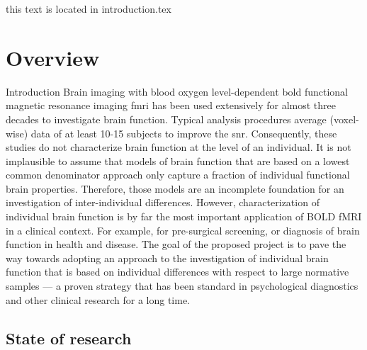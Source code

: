 this text is located in introduction.tex

\section{Overview}

%
Introduction Brain imaging with blood oxygen level-dependent \ac{bold}
functional magnetic resonance imaging \ac{fmri} has been used extensively for
almost three decades to investigate brain function.
%
Typical analysis procedures average (voxel-wise) data of at least 10-15 subjects
to improve the \ac{snr}.
%
Consequently, these studies do not characterize brain function at the level of
an individual.
%
It is not implausible to assume that models of brain function that are based on
a lowest common denominator approach only capture a fraction of individual
functional brain properties.
%
Therefore, those models are an incomplete foundation for an investigation of
inter-individual differences.
%
However, characterization of individual brain function is by far the most
important application of BOLD fMRI in a clinical context.
%
For example, for pre-surgical screening, or diagnosis of brain function in
health and disease.
%
The goal of the proposed project is to pave the way towards adopting an approach
to the investigation of individual brain function that is based on individual
differences with respect to large normative samples --- a proven strategy that
has been standard in psychological diagnostics and other clinical research for a
long time.


\subsection{State of research}

